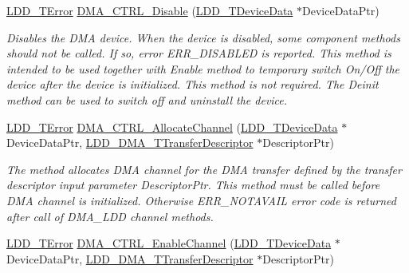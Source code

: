 \begin{DoxyCompactItemize}
\hyperlink{group___p_e___types__module_ga24c2b045fd04e79e85f261ce4df35588}{L\-D\-D\-\_\-\-T\-Error} \hyperlink{group___d_m_a___c_t_r_l__module_gaf35ca3966d15fd0e3a4eefcbcfab2fdc}{D\-M\-A\-\_\-\-C\-T\-R\-L\-\_\-\-Disable} (\hyperlink{group___p_e___types__module_gac5cf1362f1f0e3a2ce71b1bf2276d091}{L\-D\-D\-\_\-\-T\-Device\-Data} $\ast$Device\-Data\-Ptr)
\begin{DoxyCompactList}\small\item\em Disables the D\-M\-A device. When the device is disabled, some component methods should not be called. If so, error E\-R\-R\-\_\-\-D\-I\-S\-A\-B\-L\-E\-D is reported. This method is intended to be used together with Enable method to temporary switch On/\-Off the device after the device is initialized. This method is not required. The Deinit method can be used to switch off and uninstall the device. \end{DoxyCompactList}\item 
\hyperlink{group___p_e___types__module_ga24c2b045fd04e79e85f261ce4df35588}{L\-D\-D\-\_\-\-T\-Error} \hyperlink{group___d_m_a___c_t_r_l__module_gad38448a11f7f6afbe795f86fa4a19d76}{D\-M\-A\-\_\-\-C\-T\-R\-L\-\_\-\-Allocate\-Channel} (\hyperlink{group___p_e___types__module_gac5cf1362f1f0e3a2ce71b1bf2276d091}{L\-D\-D\-\_\-\-T\-Device\-Data} $\ast$Device\-Data\-Ptr, \hyperlink{struct_l_d_d___d_m_a___t_transfer_descriptor}{L\-D\-D\-\_\-\-D\-M\-A\-\_\-\-T\-Transfer\-Descriptor} $\ast$Descriptor\-Ptr)
\begin{DoxyCompactList}\small\item\em The method allocates D\-M\-A channel for the D\-M\-A transfer defined by the transfer descriptor input parameter Descriptor\-Ptr. This method must be called before D\-M\-A channel is initialized. Otherwise E\-R\-R\-\_\-\-N\-O\-T\-A\-V\-A\-I\-L error code is returned after call of D\-M\-A\-\_\-\-L\-D\-D channel methods. \end{DoxyCompactList}\item 
\hyperlink{group___p_e___types__module_ga24c2b045fd04e79e85f261ce4df35588}{L\-D\-D\-\_\-\-T\-Error} \hyperlink{group___d_m_a___c_t_r_l__module_gac803089bdb38d5f79260efb90dcd18d7}{D\-M\-A\-\_\-\-C\-T\-R\-L\-\_\-\-Enable\-Channel} (\hyperlink{group___p_e___types__module_gac5cf1362f1f0e3a2ce71b1bf2276d091}{L\-D\-D\-\_\-\-T\-Device\-Data} $\ast$Device\-Data\-Ptr, \hyperlink{struct_l_d_d___d_m_a___t_transfer_descriptor}{L\-D\-D\-\_\-\-D\-M\-A\-\_\-\-T\-Transfer\-Descriptor} $\ast$Descriptor\-Ptr)

\end{DoxyCompactItemize}
